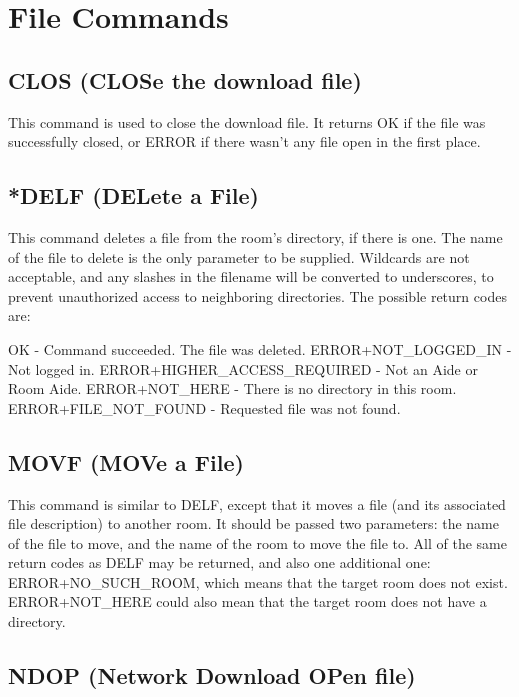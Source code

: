 \section{File Commands}



\subsection{CLOS (CLOSe the download file)}

 This command is used to close the download file.  It returns OK if the
file was successfully closed, or ERROR if there wasn't any file open in the
first place.



\subsection{*DELF (DELete a File)}

 This command deletes a file from the room's directory, if there is one.  The
name of the file to delete is the only parameter to be supplied.  Wildcards
are not acceptable, and any slashes in the filename will be converted to
underscores, to prevent unauthorized access to neighboring directories.  The
possible return codes are:

 OK                            -  Command succeeded.  The file was deleted.
 ERROR+NOT_LOGGED_IN           -  Not logged in.
 ERROR+HIGHER_ACCESS_REQUIRED  -  Not an Aide or Room Aide.
 ERROR+NOT_HERE                -  There is no directory in this room.
 ERROR+FILE_NOT_FOUND          -  Requested file was not found.



\subsection{MOVF (MOVe a File)}

 This command is similar to DELF, except that it moves a file (and its
associated file description) to another room.  It should be passed two
parameters: the name of the file to move, and the name of the room to move
the file to.  All of the same return codes as DELF may be returned, and also
one additional one: ERROR+NO_SUCH_ROOM, which means that the target room
does not exist.  ERROR+NOT_HERE could also mean that the target room does
not have a directory.



\subsection{NDOP (Network Download OPen file)}

